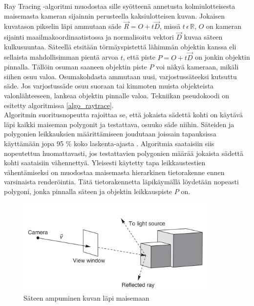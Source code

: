 \documentclass[a4paper, 12pt, titlepage]{article}
\newcommand{\R}{\mathbb{R}}
\begin{document}
Ray Tracing -algoritmi muodostaa sille syötteenä annetusta kolmiulotteisesta maisemasta kameran sijainnin perusteella kaksiulotteisen kuvan. Jokaisen kuvatason pikselin läpi ammutaan säde $\vec{R}=O+t\vec{D}$, missä $t\,\epsilon\,\R$, $O$ on kameran sijainti maailmakoordinaatistossa ja normalisoitu vektori $\vec{D}$ kuvaa säteen kulkusuuntaa. Säteellä etsitään törmäyspistettä lähimmän objektin kanssa eli sellaista mahdollisimman pientä arvoa $t$, että piste $P=O+t\vec{D}$ on jonkin objektin pinnalla. Tällöin osuman saaneen objektin piste $P$ voi näkyä kameraan, mikäli siihen osuu valoa. Osumakohdasta ammutaan uusi, varjostussäteeksi kutsuttu säde. Jos varjostussäde osuu suoraan tai kimmoten muista objekteista valonlähteeseen, lankeaa objektin pinnalle valoa. \citep[.]{janke} Tekniikan pseudokoodi on esitetty algoritmissa \ref{algo_raytrace}.\\


Algoritmin suoritusnopeutta rajoittaa se, että jokaista sädettä kohti on käytävä läpi kaikki maiseman polygonit ja testattava, osuuko säde niihin. Säteiden ja polygonien leikkauksien määrittämiseen joudutaan joissain tapauksissa käyttämään jopa 95 \% koko laskenta-ajasta \citep{whitted}. Algoritmia saataisiin siis nopeutettua huomattavasti, jos testattavien polygonien määrää jokaista sädettä kohti saataisiin vähennettyä. Yleisesti käytetty tapa leikkaustestien vähentämiseksi on muodostaa maisemasta hierarkinen tietorakenne ennen varsinaista renderöintia. Tätä tietorakennetta läpikäymällä löydetään nopeasti polygoni, jonka pinnalla säteen ja objektin leikkauspiste $P$ on. \citep[.]{rubin}

\begin{figure}
 \centering 
 \includegraphics[width=0.9\textwidth]{img/raytracing.png}
 \vspace{0.4cm}
 \caption{Säteen ampuminen kuvan läpi maisemaan \citep{janke}}
 \label{raytracing}
\end{figure}
\end{document}
